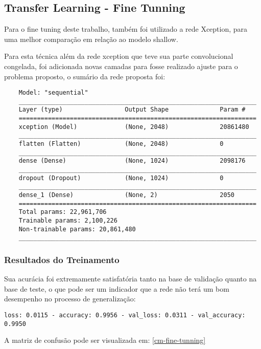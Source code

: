 \subsection{Transfer Learning - Fine Tunning}

Para o fine tuning deste trabalho, também foi utilizado a rede Xception, para uma melhor comparação em relação ao modelo shallow.

Para esta técnica além da rede xception que teve sua parte convolucional congelada, foi adicionada novas camadas para fosse realizado ajuste para o problema proposto, o sumário da rede proposta foi:

\begin{verbatim}
	Model: "sequential"
	_________________________________________________________________
	Layer (type)                 Output Shape              Param #   
	=================================================================
	xception (Model)             (None, 2048)              20861480  
	_________________________________________________________________
	flatten (Flatten)            (None, 2048)              0         
	_________________________________________________________________
	dense (Dense)                (None, 1024)              2098176   
	_________________________________________________________________
	dropout (Dropout)            (None, 1024)              0         
	_________________________________________________________________
	dense_1 (Dense)              (None, 2)                 2050      
	=================================================================
	Total params: 22,961,706
	Trainable params: 2,100,226
	Non-trainable params: 20,861,480
	_________________________________________________________________
\end{verbatim}

\subsubsection{Resultados do Treinamento}

Sua acurácia foi extremamente satisfatória tanto na base de validação quanto na base de teste, o que pode ser um indicador que a rede não terá um bom desempenho no processo de generalização:
\begin{verbatim}
loss: 0.0115 - accuracy: 0.9956 - val_loss: 0.0311 - val_accuracy: 0.9950
\end{verbatim}

A matriz de confusão pode ser visualizada em: \autoref{cm-fine-tunning}